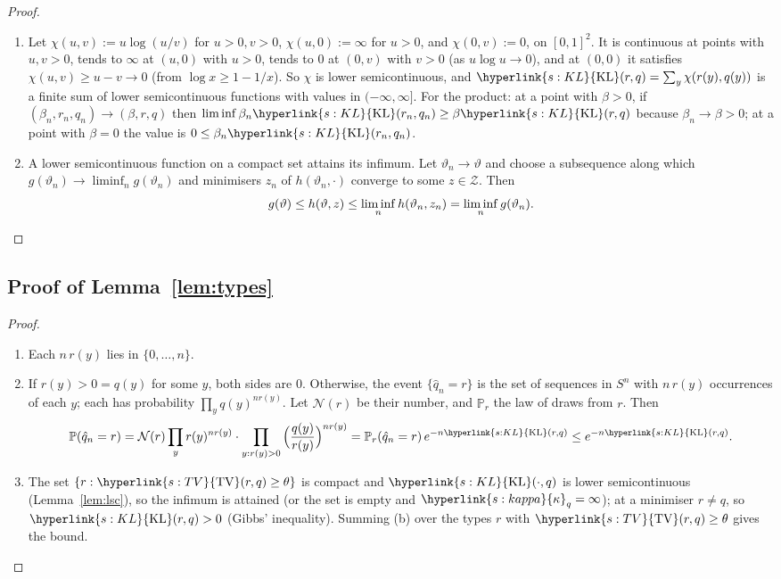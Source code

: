 \documentclass[11pt]{article}
\newcommand{\PP}{\mathbb{P}}
\newcommand{\sy}[2]{{\hyperlink{#1}{#2}}}
\newcommand{\KL}{\sy{s:KL}{\mathrm{KL}}}
\newcommand{\TV}{\sy{s:TV}{\mathrm{TV}}}
\newcommand{\kap}{\sy{s:kappa}{\kappa}}
\begin{document}
\begin{proof}
\begin{enumerate}
\item[(a)] Let $\chi(u,v):=u\log(u/v)$ for $u>0,v>0$, $\chi(u,0):=\infty$ for $u>0$, and
  $\chi(0,v):=0$, on $[0,1]^2$. It is continuous at points with $u,v>0$, tends to $\infty$ at
  $(u,0)$ with $u>0$, tends to $0$ at $(0,v)$ with $v>0$ (as $u\log u\to0$), and at $(0,0)$ it
  satisfies $\chi(u,v)\ge u-v\to0$ (from $\log x\ge1-1/x$). So $\chi$ is lower semicontinuous, and
  $\KL(r,q)=\sum_y\chi(r(y),q(y))$ is a finite sum of lower semicontinuous functions with values in
  $(-\infty,\infty]$. For the product: at a point with $\beta>0$, if
  $(\beta_n,r_n,q_n)\to(\beta,r,q)$ then $\liminf\beta_n\KL(r_n,q_n)\ge\beta\KL(r,q)$ because
  $\beta_n\to\beta>0$; at a point with $\beta=0$ the value is $0\le\beta_n\KL(r_n,q_n)$.
\item[(b)] A lower semicontinuous function on a compact set attains its infimum. Let
  $\vartheta_n\to\vartheta$ and choose a subsequence along which
  $g(\vartheta_n)\to\liminf_ng(\vartheta_n)$ and minimisers $z_n$ of $h(\vartheta_n,\cdot)$
  converge to some $z\in\mathcal Z$. Then
  \begin{equation*}
  g(\vartheta)\le h(\vartheta,z)\le\liminf_nh(\vartheta_n,z_n)=\liminf_ng(\vartheta_n).\qedhere
  \end{equation*}
\end{enumerate}
\end{proof}

\subsection{Proof of Lemma~\ref{lem:types}}\label{sec:proof-lem-types}

\begin{proof}
\begin{enumerate}
\item[(a)] Each $n\,r(y)$ lies in $\{0,\dots,n\}$.
\item[(b)] If $r(y)>0=q(y)$ for some $y$, both sides are $0$. Otherwise, the event $\{\hat q_n=r\}$
  is the set of sequences in $S^n$ with $n\,r(y)$ occurrences of each $y$; each has probability
  $\prod_yq(y)^{nr(y)}$. Let $\mathcal N(r)$ be their number, and $\PP_r$ the law of draws from $r$.
  Then
  \begin{equation*}
  \PP(\hat q_n=r)=\mathcal N(r)\prod_{y}r(y)^{nr(y)}\cdot\prod_{y:r(y)>0}\Big(\frac{q(y)}{r(y)}\Big)^{nr(y)}
  =\PP_r(\hat q_n=r)\,e^{-n\KL(r,q)}\le e^{-n\KL(r,q)}.
  \end{equation*}
\item[(c)] The set $\{r:\TV(r,q)\ge\theta\}$ is compact and $\KL(\cdot,q)$ is lower semicontinuous
  (Lemma~\ref{lem:lsc}), so the infimum is attained (or the set is empty and $\kap_q=\infty$); at
  a minimiser $r\ne q$, so $\KL(r,q)>0$ (Gibbs' inequality). Summing (b) over the types $r$ with
  $\TV(r,q)\ge\theta$ gives the bound.\qedhere
\end{enumerate}
\end{proof}
\end{document}
